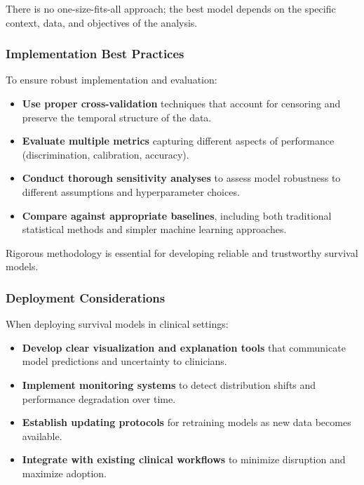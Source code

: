 There is no one-size-fits-all approach; the best model depends on the specific context, data, and objectives of the analysis.

\subsubsection{Implementation Best Practices}

To ensure robust implementation and evaluation:

\begin{itemize}
    \item \textbf{Use proper cross-validation} techniques that account for censoring and preserve the temporal structure of the data.

    \item \textbf{Evaluate multiple metrics} capturing different aspects of performance (discrimination, calibration, accuracy).

    \item \textbf{Conduct thorough sensitivity analyses} to assess model robustness to different assumptions and hyperparameter choices.

    \item \textbf{Compare against appropriate baselines}, including both traditional statistical methods and simpler machine learning approaches.
\end{itemize}

Rigorous methodology is essential for developing reliable and trustworthy survival models.

\subsubsection{Deployment Considerations}

When deploying survival models in clinical settings:

\begin{itemize}
    \item \textbf{Develop clear visualization and explanation tools} that communicate model predictions and uncertainty to clinicians.

    \item \textbf{Implement monitoring systems} to detect distribution shifts and performance degradation over time.

    \item \textbf{Establish updating protocols} for retraining models as new data becomes available.

    \item \textbf{Integrate with existing clinical workflows} to minimize disruption and maximize adoption.
\end{itemize}

